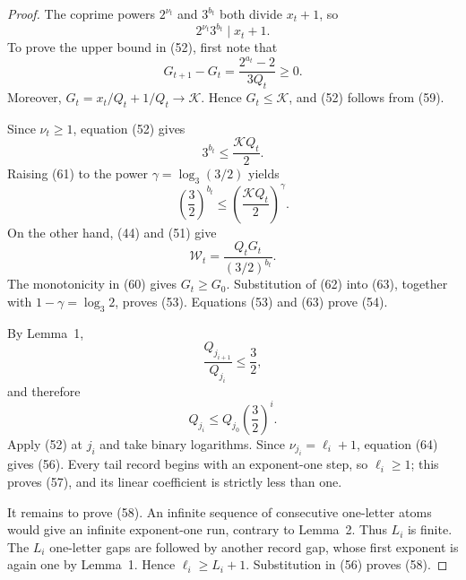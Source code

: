 \documentclass[11pt]{article}
\begin{document}
\begin{proof}
The coprime powers $2^{\nu_t}$ and $3^{b_t}$ both divide $x_t+1$, so
\[
  2^{\nu_t}3^{b_t}\mid x_t+1.
  \tag{59}
\]
To prove the upper bound in (52), first note that
\[
  G_{t+1}-G_t
  =\frac{2^{a_t}-2}{3Q_t}\geq0.
  \tag{60}
\]
Moreover, $G_t=x_t/Q_t+1/Q_t\to\mathcal K$.  Hence
$G_t\leq\mathcal K$, and (52) follows from (59).

Since $\nu_t\geq1$, equation (52) gives
\[
  3^{b_t}\leq\frac{\mathcal KQ_t}{2}.
  \tag{61}
\]
Raising (61) to the power
$\gamma=\log_3(3/2)$ yields
\[
  \left(\frac32\right)^{b_t}
  \leq
  \left(\frac{\mathcal KQ_t}{2}\right)^\gamma.
  \tag{62}
\]
On the other hand, (44) and (51) give
\[
  \mathcal W_t
  =\frac{Q_tG_t}{(3/2)^{b_t}}.
  \tag{63}
\]
The monotonicity in (60) gives $G_t\geq G_0$.  Substitution of (62) into
(63), together with $1-\gamma=\log_3 2$, proves (53).  Equations (53) and
(63) prove (54).

By Lemma~1,
\[
  \frac{Q_{j_{i+1}}}{Q_{j_i}}\leq\frac32,
\]
and therefore
\[
  Q_{j_i}\leq Q_{j_0}\left(\frac32\right)^i.
  \tag{64}
\]
Apply (52) at $j_i$ and take binary logarithms.  Since
$\nu_{j_i}=\ell_i+1$, equation (64) gives (56).  Every tail record begins
with an exponent-one step, so $\ell_i\geq1$; this proves (57), and its
linear coefficient is strictly less than one.

It remains to prove (58).  An infinite sequence of consecutive one-letter
atoms would give an infinite exponent-one run, contrary to Lemma~2.  Thus
$L_i$ is finite.  The $L_i$ one-letter gaps are followed by another record
gap, whose first exponent is again one by Lemma~1.  Hence
$\ell_i\geq L_i+1$.  Substitution in (56) proves (58).
\end{proof}
\end{document}
